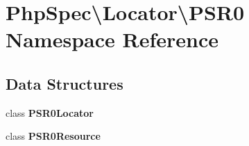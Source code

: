 \section{Php\+Spec\textbackslash{}Locator\textbackslash{}P\+S\+R0 Namespace Reference}
\label{namespace_php_spec_1_1_locator_1_1_p_s_r0}
\subsection*{Data Structures}
\begin{DoxyCompactItemize}
\item 
class {\bf P\+S\+R0\+Locator}
\item 
class {\bf P\+S\+R0\+Resource}
\end{DoxyCompactItemize}
